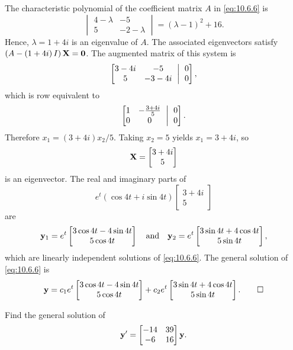 \begin{solution}
The characteristic polynomial of the coefficient matrix $A$
in \eqref{eq:10.6.6} is
\[
\begin{vmatrix}4-\lambda&-5\\ 5&-2-\lambda\end{vmatrix}=(\lambda-1)^2+16.
\]
Hence, $\lambda=1+4i$ is an eigenvalue of $A$. The associated
eigenvectors satisfy $\left(A-\left(1+4i\right)I\right)\mathbf{X}=\mathbf{0}$. The augmented matrix of this system is
\[
\amatrix{3-4i&-5\\5&-3-4i}{0\\0},
 \]
which is row equivalent to
\[
\amatrix{1&-\frac{3+4i}{5}\\0&0}{0\\0}.
\]
Therefore $x_1=(3+4i)x_2/5$. Taking $x_2=5$ yields $x_1=3+4i$, so
\[
\mathbf{X}=\begin{bmatrix}3+4i\\5\end{bmatrix}
\]
is an eigenvector.  The real and imaginary parts of
\[
e^t(\cos4t+i\sin4t)\begin{bmatrix}3+4i\\5\end{bmatrix}
\]
 are
\[
\mathbf{y}_1=e^t\begin{bmatrix}3\cos4t-4\sin4t\\5\cos4t\end{bmatrix}
\quad\text{and}\quad
\mathbf{y}_2=e^t\begin{bmatrix}3\sin4t+4\cos4t\\5\sin4t\end{bmatrix},
\]
which are linearly independent solutions of  \eqref{eq:10.6.6}.
The general solution of \eqref{eq:10.6.6} is
\[
\mathbf{y}=
c_1e^t\begin{bmatrix}3\cos4t-4\sin4t\\5\cos4t\end{bmatrix}+
c_2e^t\begin{bmatrix}3\sin4t+4\cos4t\\5\sin4t\end{bmatrix}.\qedhere
\]
\end{solution}

\begin{example}\label{example:10.6.2}
 Find  the general solution of
\begin{equation} \label{eq:10.6.7}
\mathbf{y}'=\begin{bmatrix}-14&39\\-6&16\end{bmatrix}\mathbf{y}.
\end{equation}
\end{example}

